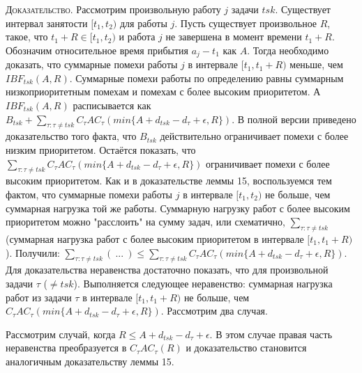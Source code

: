 \textsc{Доказательство.}
  Рассмотрим произвольную работу $j$ задачи $tsk$.
  Существует интервал занятости $[t_1, t_2)$ для работы $j$.
  Пусть существует произвольное $R$, такое, что $t_1 + R \in [t_1, t_2)$ и работа $j$
    не завершена в момент времени $t_1 + R$.
  Обозначим относительное время прибытия $a_j - t_1 $ как $A$.
  Тогда необходимо доказать, что суммарные помехи работы $j$ в интервале $[t_1, t_1 + R)$
    меньше, чем $IBF_{tsk}(A, R)$.
  Суммарные помехи работы по определению равны суммарным низкоприоритетным помехам и
    помехам с более высоким приоритетом. А $IBF_{tsk}(A, R)$ расписывается как
    $B_{tsk} + \sum_{\tau:\tau \neq tsk} C_{\tau}AC_{\tau}( min\{A + d_{tsk} - d_{\tau} + \epsilon, R\} )$.
  В полной версии приведено доказательство того факта, что $B_{tsk}$ действительно ограничивает
    помехи с более низким приоритетом. Остаётся показать, что
    $\sum_{\tau:\tau \neq tsk} C_{\tau}AC_{\tau}( min\{A + d_{tsk} - d_{\tau} + \epsilon, R\} )$
    ограничивает помехи с более высоким приоритетом.
  Как и в доказательстве леммы 15, воспользуемся тем фактом, что суммарные помехи
    работы $j$ в интервале $[t_1, t_2)$ не больше, чем суммарная нагрузка той же работы.
  Суммарную нагрузку работ с более высоким приоритетом можно "расслоить" на сумму задач,
    или схематично,
    $\sum_{\tau:\tau \neq tsk}$
      (суммарная нагрузка работ с более высоким приоритетом в интервале $[t_1, t_1 + R)$).
  Получили: $\sum_{\tau:\tau \neq tsk} (\ ... \ )
    \leq\sum_{\tau:\tau \neq tsk} C_{\tau}AC_{\tau}( min\{A + d_{tsk} - d_{\tau} + \epsilon, R\} )$.
  Для доказательства неравенства достаточно показать, что для произвольной задачи $\tau$ ($\neq tsk$).
    Выполняется следующее неравенство: суммарная нагрузка работ из задачи $\tau$ в интервале $[t_1, t_1 + R)$
      не больше, чем $C_{\tau}AC_{\tau}( min\{A + d_{tsk} - d_{\tau} + \epsilon, R\} )$.
  Рассмотрим два случая.

  Рассмотрим случай, когда $R \leq A + d_{tsk} - d_{\tau} + \epsilon$. В этом случае правая часть
    неравенства преобразуется в $C_{\tau}AC_{\tau}(R)$ и доказательство становится
    аналогичным доказательству леммы 15.


